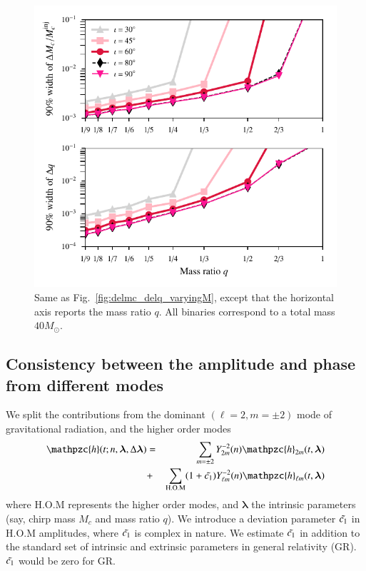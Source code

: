 \documentclass[prd,preprintnumbers,twocolumn,eqsecnum,floatfix,a4paper,nofootinbib,superscriptaddress]{revtex4}
\newcommand{\h}{\mathpzc{h}}
\newcommand{\hlm}{\mathpzc{h}_{\ell m}}
\newcommand{\Ylm}{{Y}^{-2}_{\ell m}}
\newcommand{\blambda}{\bm{\lambda}}
\begin{document}
 \begin{figure}[tbh]
 	\begin{center}
 		\includegraphics[scale=0.8]{figs/hm_9dim_dmcbymcinj_dq_diff_q.pdf}
 	\end{center} 
 	\caption{Same as Fig.~\ref{fig:delmc_delq_varyingM}, except that the horizontal axis reports the mass ratio $q$. All binaries correspond to a total mass $40M_{\odot}$.}
 	\label{fig:delmc_delq_varyingq}
 \end{figure}

\newpage
\subsection{Consistency between the amplitude and phase from different modes}
We split the contributions from the dominant $(\ell = 2, m = \pm 2)$ mode of gravitational radiation, and the higher order modes 
\begin{eqnarray}
{\h}(t; n, \blambda, \Delta \blambda) & = & \sum_{m = \pm2} Y^{-2}_{2m} (n) {\h}_{2m}(t, \blambda)  \nonumber \\ 
& + & \sum _{\text{H.O.M}} (1+\Tilde{c_1})\Ylm (n) \hlm(t, \blambda)
\label{eq:test_amp}
\end{eqnarray}
where  H.O.M represents the higher order modes, and $\blambda$ the intrinsic parameters (say, chirp mass $M_c$ and mass ratio $q$). We introduce a deviation parameter $\Tilde{c_1}$ in H.O.M amplitudes, where $\Tilde{c_1}$ is complex in nature. We estimate $\Tilde{c_1}$ in addition to the standard set of intrinsic and extrinsic parameters in general relativity (GR). $\Tilde{c_1}$ would be zero for GR.
\end{document}
